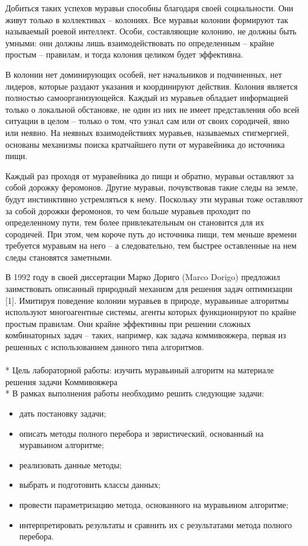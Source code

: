 \documentclass[a4paper,12pt]{article}
\begin{document}
Добиться таких успехов муравьи способны благодаря своей социальности. Они живут только в коллективах – колониях. Все муравьи колонии формируют так называемый роевой интеллект. Особи, составляющие колонию, не должны быть умными: они должны лишь взаимодействовать по определенным – крайне простым – правилам, и тогда колония целиком будет эффективна.

В колонии нет доминирующих особей, нет начальников и подчиненных, нет лидеров, которые раздают указания и координируют действия. Колония является полностью самоорганизующейся. Каждый из муравьев обладает информацией только о локальной обстановке, не один из них не имеет представления обо всей ситуации в целом – только о том, что узнал сам или от своих сородичей, явно или неявно. На неявных взаимодействиях муравьев, называемых стигмергией, основаны механизмы поиска кратчайшего пути от муравейника до источника пищи.

Каждый раз проходя от муравейника до пищи и обратно, муравьи оставляют за собой дорожку феромонов. Другие муравьи, почувствовав такие следы на земле, будут инстинктивно устремляться к нему. Поскольку эти муравьи тоже оставляют за собой дорожки феромонов, то чем больше муравьев проходит по определенному пути, тем более привлекательным он становится для их сородичей. При этом, чем короче путь до источника пищи, тем меньше времени требуется муравьям на него – а следовательно, тем быстрее оставленные на нем следы становятся заметными.

В 1992 году в своей диссертации Марко Дориго (Marco Dorigo) предложил заимствовать описанный природный механизм для решения задач оптимизации [1]. Имитируя поведение колонии муравьев в природе, муравьиные алгоритмы используют многоагентные системы, агенты которых функционируют по крайне простым правилам. Они крайне эффективны при решении сложных комбинаторных задач – таких, например, как задача коммивояжера, первая из решенных с использованием данного типа алгоритмов.
\\ \\*
		Цель лабораторной работы: изучить муравьиный алгоритм на материале решения задачи Коммивояжера \\*
В рамках выполнения работы необходимо решить следующие задачи:
		\begin{itemize}
			\item дать постановку задачи;
			\item описать методы полного перебора и эвристический, основанный на муравьином алгоритме;
			\item реализовать данные методы;
			\item выбрать и подготовить классы данных;
			\item провести параметризацию метода, основанного на муравьином алгоритме;
			\item интерпретировать результаты и сравнить их с результатами метода полного перебора.
		\end{itemize}
    \newpage
\end{document}
